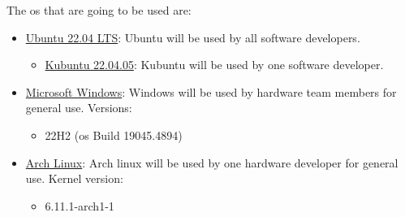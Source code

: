 The \ac{os} that are going to be used are:
\begin{itemize}
    \item \href{https://releases.ubuntu.com/jammy/}{Ubuntu 22.04 LTS}: Ubuntu will be used by all software developers.
    \begin{itemize}
        \item \href{https://kubuntu.org/getkubuntu/}{Kubuntu 22.04.05}: Kubuntu will be used by one software developer.
    \end{itemize}
    \item \href{https://www.microsoft.com/en-us/download/windows}{Microsoft Windows}: Windows will be used by hardware team members for general use. Versions:
    \begin{itemize}
        \item 22H2 (\ac{os} Build 19045.4894)
    \end{itemize}
    \item \href{https://archlinux.org/}{Arch Linux}: Arch linux will be used by one hardware developer for general use. Kernel version:
    \begin{itemize}
        \item 6.11.1-arch1-1
    \end{itemize}
\end{itemize}

